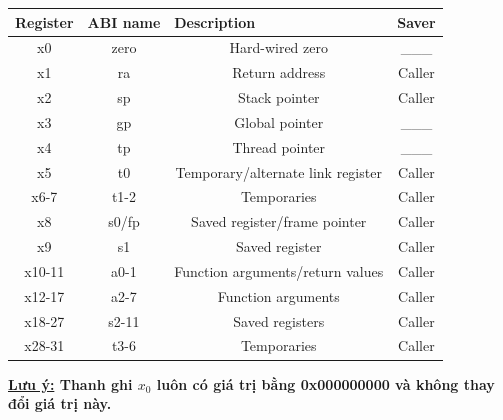 \documentclass[E:/Latex/ExtraWork/ComputerArchitechture/Report.tex]{subfiles}
\begin{document}
				\begin{table}[!ht]
				\begin{center}
				\begin{tabular}{|c|c|c|c|}
					\hline
					\multicolumn{1}{|l|}{\textbf {Register}} & \multicolumn{1}{l|}{\textbf {ABI name}} & \multicolumn{1}{l|}{\textbf {Description}}  & \multicolumn{1}{l|}{\textbf {Saver}} \\ 
					\hline
					x0                             & zero                          & Hard-wired zero                   & \_\_\_                     \\
					x1                             & ra                            & Return address                    & Caller                     \\
					x2                             & sp                            & Stack pointer                     & Caller                     \\
					x3                             & gp                            & Global pointer                    & \_\_\_                     \\
					x4                             & tp                            & Thread pointer                    & \_\_\_                     \\
					x5                             & t0                            & Temporary/alternate link register & Caller                     \\
					x6-7                           & t1-2                          & Temporaries                       & Caller                     \\
					x8                             & s0/fp                         & Saved register/frame pointer      & Caller                     \\
					x9                             & s1                            & Saved register                    & Caller                     \\
					x10-11                         & a0-1                          & Function arguments/return values  & Caller                     \\
					x12-17                         & a2-7                          & Function arguments                & Caller                     \\
					x18-27                         & s2-11                         & Saved registers                   & Caller                     \\
					x28-31                         & t3-6                          & Temporaries                       & Caller                     \\ 
					\hline 
					\end{tabular}
					\end{center}
					\end{table}
	\textbf {\underline{Lưu ý:} Thanh ghi $x_0$ luôn có giá trị bằng 0x000000000 và không thay đổi giá trị này.}
							
\end{document}
